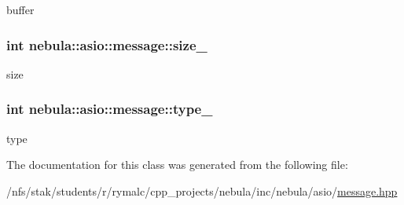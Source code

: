 buffer \hypertarget{classnebula_1_1asio_1_1message_a9ac3a43a791dc33d15ca5395117080a1}{
\subsubsection[{size\_\-}]{\setlength{\rightskip}{0pt plus 5cm}int {\bf nebula::asio::message::size\_\-}}}
\label{classnebula_1_1asio_1_1message_a9ac3a43a791dc33d15ca5395117080a1}


size \hypertarget{classnebula_1_1asio_1_1message_a3eb27509e00e7825ab9f4c83557725f3}{
\subsubsection[{type\_\-}]{\setlength{\rightskip}{0pt plus 5cm}int {\bf nebula::asio::message::type\_\-}}}
\label{classnebula_1_1asio_1_1message_a3eb27509e00e7825ab9f4c83557725f3}


type 

The documentation for this class was generated from the following file:\begin{DoxyCompactItemize}
\item 
/nfs/stak/students/r/rymalc/cpp\_\-projects/nebula/inc/nebula/asio/\hyperlink{message_8hpp}{message.hpp}\end{DoxyCompactItemize}

